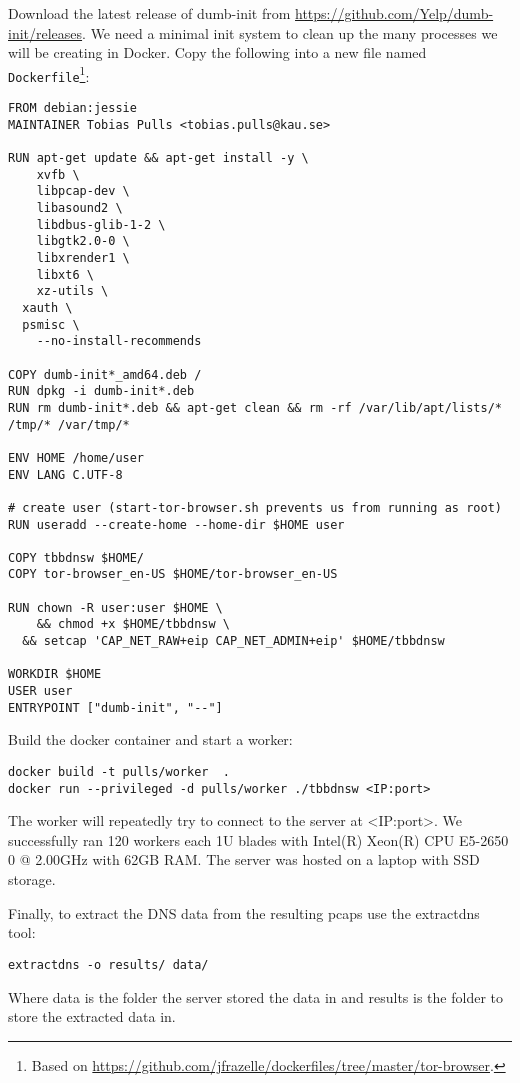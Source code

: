 Download the latest release of dumb-init from
\url{https://github.com/Yelp/dumb-init/releases}. We need a minimal init system
to clean up the many processes we will be creating in Docker.
Copy the following into a
new file named \texttt{Dockerfile}\footnote{Based on
\url{https://github.com/jfrazelle/dockerfiles/tree/master/tor-browser}.}:

\begin{lstlisting}
FROM debian:jessie
MAINTAINER Tobias Pulls <tobias.pulls@kau.se>

RUN apt-get update && apt-get install -y \
	xvfb \
	libpcap-dev \
	libasound2 \
	libdbus-glib-1-2 \
	libgtk2.0-0 \
	libxrender1 \
	libxt6 \
	xz-utils \
  xauth \
  psmisc \
	--no-install-recommends

COPY dumb-init*_amd64.deb /
RUN dpkg -i dumb-init*.deb
RUN rm dumb-init*.deb && apt-get clean && rm -rf /var/lib/apt/lists/* /tmp/* /var/tmp/*

ENV HOME /home/user
ENV LANG C.UTF-8

# create user (start-tor-browser.sh prevents us from running as root)
RUN useradd --create-home --home-dir $HOME user

COPY tbbdnsw $HOME/
COPY tor-browser_en-US $HOME/tor-browser_en-US

RUN chown -R user:user $HOME \
	&& chmod +x $HOME/tbbdnsw \
  && setcap 'CAP_NET_RAW+eip CAP_NET_ADMIN+eip' $HOME/tbbdnsw

WORKDIR $HOME
USER user
ENTRYPOINT ["dumb-init", "--"]
\end{lstlisting}

Build the docker container and start a worker:

\begin{lstlisting}
docker build -t pulls/worker  .
docker run --privileged -d pulls/worker ./tbbdnsw <IP:port>
\end{lstlisting}
The worker will repeatedly try to connect to the server at <IP:port>. We
successfully ran 120 workers each 1U blades
with Intel(R) Xeon(R) CPU E5-2650 0 @ 2.00GHz with 62GB RAM. The server was
hosted on a laptop with SSD storage.

Finally, to extract the DNS data from the resulting pcaps use the
extractdns tool:

\begin{lstlisting}
extractdns -o results/ data/
\end{lstlisting}
Where data is the folder the server stored the data in and results is the folder
to store the extracted data in.

